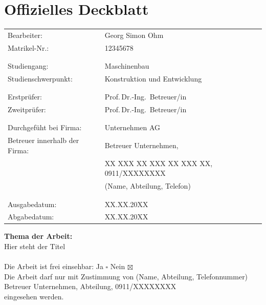 \documentclass[captions=tableheading, listof=leveldown, 11pt]{scrartcl}
\newcommand{\titel}{Hier steht der Titel}
\newcommand{\autor}{Georg Simon Ohm}
\newcommand{\matrikelnr}{12345678}
\newcommand{\erstgutachter}{Prof.\,Dr.-Ing.~Betreuer/in}
\newcommand{\zweitgutachter}{Prof.\,Dr.-Ing.~Betreuer/in}
\newcommand{\betreuer}{Betreuer Unternehmen}
\newcommand{\abgabe}{XX.XX.20XX}          %
\newcommand{\ausgabe}{XX.XX.20XX}
\begin{document}
\section*{Offizielles Deckblatt} %
\begin{table}[htbp]
\hspace{-0.37cm}
      \begin{tabular}{ll}
    Bearbeiter: & \autor \\
    Matrikel-Nr.: & \matrikelnr \\
          &  \\
          &  \\
    Studiengang: & Maschinenbau \\
    Studienschwerpunkt: & Konstruktion und Entwicklung \\
          &  \\
          &  \\
    Erstprüfer: & \erstgutachter \\
    Zweitprüfer: & \zweitgutachter \\
          &  \\
          &  \\
    Durchgefüht bei Firma: & Unternehmen AG \\
    Betreuer innerhalb der Firma: & \betreuer, \\
          & XX XXX XX XXX XX XXX XX, 0911/XXXXXXXX \\
          & (Name, Abteilung, Telefon) \\
          &  \\
          &  \\
    Ausgabedatum: & \ausgabe \\
    Abgabedatum: & \abgabe \\
    \end{tabular}%
  \label{tab:addlabel}%
\end{table}
\vspace{1cm}
\noindent
\textbf{Thema der Arbeit:}\\
\titel
\\\\
Die Arbeit ist frei einsehbar: \hspace{1cm}Ja $\square$   \hspace{3cm}   Nein $\boxtimes$ \\ %
Die Arbeit darf nur mit Zustimmung von (Name, Abteilung, Telefonnummer)\\
\betreuer, Abteilung, 0911/XXXXXXXX\\
eingesehen werden.
\newpage
\end{document}
